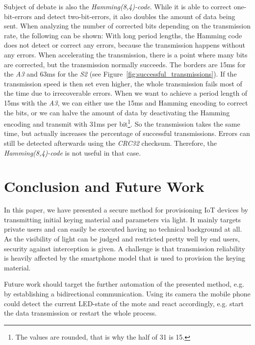 \documentclass{sig-alternate} %
\begin{document}
Subject of debate is also the \textit{Hamming(8,4)-code}.
While it is able to correct one-bit-errors and detect two-bit-errors, it also doubles the amount of data being sent.
When analyzing the number of corrected bits depending on the transmission rate, the following can be shown:
With long period lengths, the Hamming code does not detect or correct any errors, because the transmission happens without any errors.
When accelerating the transmission, there is a point where many bits are corrected, but the transmission normally succeeds.
The borders are 15ms for the \textit{A3} and 63ms for the \textit{S2} (see Figure~\ref{fig:successful_transmissions}).
If the transmission speed is then set even higher, the whole transmission fails most of the time due to irrecoverable errors.
When we want to achieve a period length of 15ms with the \textit{A3}, we can either use the 15ms and Hamming encoding to correct the bits, or we can halve the amount of data by deactivating the Hamming encoding and transmit with 31ms per bit\footnote{The values are rounded, that is why the half of 31 is 15.}.
So the transmission takes the same time, but actually increases the percentage of successful transmissions.
Errors can still be detected afterwards using the \textit{CRC32} checksum.
Therefore, the \textit{Hamming(8,4)-code} is not useful in that case.



\section{Conclusion and Future Work}
\label{sec:future_work}

In this paper, we have presented a secure method for provisioning IoT devices by transmitting initial keying material and parameters via light.
It mainly targets private users and can easily be executed having no technical background at all.
As the visibility of light can be judged and restricted pretty well by end users, security against interception is given.
A challenge is that transmission reliability is heavily affected by the smartphone model that is used to provision the keying material.

Future work should target the further automation of the presented method, e.g. by establishing a bidirectional communication.
Using its camera the mobile phone could detect the current LED-state of the mote and react accordingly, e.g. start the data transmission or restart the whole process.
\end{document}
